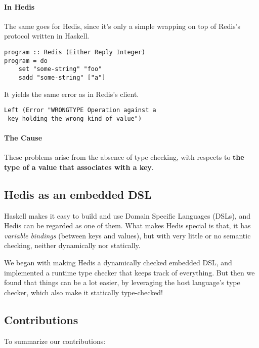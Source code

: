 \documentclass[pldi]{sigplanconf-pldi16}
\begin{document}
\paragraph{In Hedis} The same goes for Hedis, since it's only a simple wrapping
 on top of Redis's protocol written in Haskell.

\begin{verbatim}
program :: Redis (Either Reply Integer)
program = do
    set "some-string" "foo"
    sadd "some-string" ["a"]
\end{verbatim}

It yields the same error as in Redis's client.

\begin{verbatim}
Left (Error "WRONGTYPE Operation against a
 key holding the wrong kind of value")
\end{verbatim}

\paragraph{The Cause} These problems arise from the absence of type checking,
 with respects to \textbf{the type of a value that associates with a key}.

\subsection{Hedis as an embedded DSL}

Haskell makes it easy to build and use Domain Specific Languages (DSLs),
 and Hedis can be regarded as one of them. What makes Hedis special is that,
 it has \emph{variable bindings} (between keys and values), but with very
 little or no semantic checking, neither dynamically nor statically.

We began with making Hedis a dynamically checked embedded DSL, and implemented a
 runtime type checker that keeps track of everything. But then we found that
 things can be a lot easier, by leveraging the host language's type checker,
 which also make it statically type-checked!

\subsection{Contributions}

To summarize our contributions:
\end{document}
